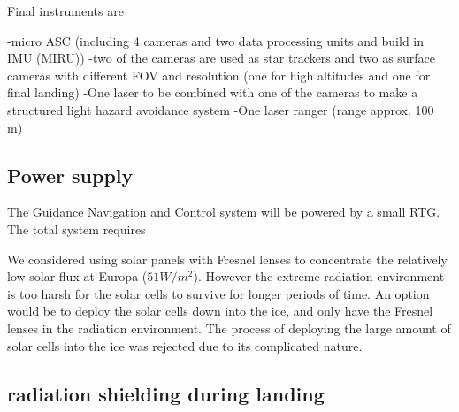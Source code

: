 Final instruments are 

-micro ASC (including 4 cameras and two data processing units and build in IMU (MIRU))
-two of the cameras are used as star trackers and two as surface cameras with different FOV and resolution (one for high altitudes and one for final landing)
-One laser to be combined with one of the cameras to make a structured light hazard avoidance system
-One laser ranger (range approx. 100 m)


\subsection{Power supply}

The Guidance Navigation and Control system will be powered by a small RTG. The total system requires 

We considered using solar panels with Fresnel lenses to concentrate the relatively low solar flux at Europa ($51 W/m^2$). However the extreme radiation environment is too harsh for the solar cells to survive for longer periods of time. An option would be to deploy the solar cells down into the ice, and only have the Fresnel lenses in the radiation environment. The process of deploying the large amount of solar cells into the ice was rejected due to its complicated nature. 




\subsection{radiation shielding during landing}